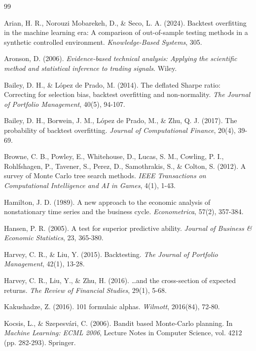 \documentclass[12pt,a4paper,oneside]{book}
\theoremstyle{definition}
\begin{document}
\begin{thebibliography}{99}

Arian, H. R., Norouzi Mobarekeh, D., \& Seco, L. A. (2024). Backtest overfitting in the machine learning era: A comparison of out-of-sample testing methods in a synthetic controlled environment. \textit{Knowledge-Based Systems}, 305.

Aronson, D. (2006). \textit{Evidence-based technical analysis: Applying the scientific method and statistical inference to trading signals}. Wiley.

Bailey, D. H., \& L\'opez de Prado, M. (2014). The deflated Sharpe ratio: Correcting for selection bias, backtest overfitting and non-normality. \textit{The Journal of Portfolio Management}, 40(5), 94-107.

Bailey, D. H., Borwein, J. M., L\'opez de Prado, M., \& Zhu, Q. J. (2017). The probability of backtest overfitting. \textit{Journal of Computational Finance}, 20(4), 39-69.

Browne, C. B., Powley, E., Whitehouse, D., Lucas, S. M., Cowling, P. I., Rohlfshagen, P., Tavener, S., Perez, D., Samothrakis, S., \& Colton, S. (2012). A survey of Monte Carlo tree search methods. \textit{IEEE Transactions on Computational Intelligence and AI in Games}, 4(1), 1-43.

Hamilton, J. D. (1989). A new approach to the economic analysis of nonstationary time series and the business cycle. \textit{Econometrica}, 57(2), 357-384.

Hansen, P. R. (2005). A test for superior predictive ability. \textit{Journal of Business \& Economic Statistics}, 23, 365-380.

Harvey, C. R., \& Liu, Y. (2015). Backtesting. \textit{The Journal of Portfolio Management}, 42(1), 13-28.

Harvey, C. R., Liu, Y., \& Zhu, H. (2016). \ldots and the cross-section of expected returns. \textit{The Review of Financial Studies}, 29(1), 5-68.

Kakushadze, Z. (2016). 101 formulaic alphas. \textit{Wilmott}, 2016(84), 72-80.

Kocsis, L., \& Szepesv\'ari, C. (2006). Bandit based Monte-Carlo planning. In \textit{Machine Learning: ECML 2006}, Lecture Notes in Computer Science, vol. 4212 (pp. 282-293). Springer.


\end{thebibliography}
\end{document}
